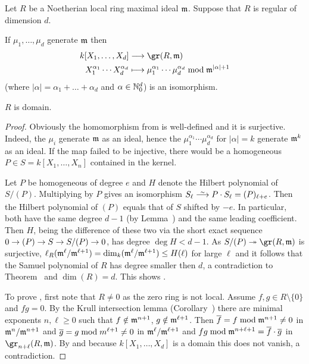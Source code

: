 \documentclass[a4paper,parskip=half,numbers=enddot, DIV=12]{scrreprt}
\begin{document}
\begin{cor}
    Let $R$ be a Noetherian local ring maximal ideal $\mathfrak{m}$. Suppose that $R$ is regular of dimension $d$.
    \begin{alphanumerate}
    \item 
        If $\mu_1,\ldots, \mu_d$ generate $\mathfrak{m}$ then 
        \begin{align*} 
            k[X_1,\ldots, X_d] &\morphism \gr(R,\mm)\\
            X_1^{\alpha_1}\cdots X_d^{\alpha_d} &\longmapsto \mu_1^{\alpha_1}\cdots\mu_d^{\alpha_d} \bmod \mm^{|\alpha| +1}
        \end{align*}
        (where $|\alpha|=\alpha_1+\ldots+\alpha_d$ and $\alpha\in\mathbb{N}_0^d$) is an isomorphism.
    \item 
        $R$ is domain.
    \end{alphanumerate}
\end{cor}
\begin{proof}
    Obviously the homomorphism from  is well-defined and it is surjective. Indeed, the $\mu_i$ generate $\mathfrak{m}$ as an ideal, hence the $\mu_1^{\alpha_1}\cdots\mu_d^{\alpha_d}$ for $|\alpha|=k$ generate $\mathfrak{m}^k$ as an ideal. If the map failed to be injective, there would be a homogeneous $P\in S=k[X_1,\ldots, X_n]$ contained in the kernel. 
    
    Let $P$ be homogeneous of degree $e$ and $H$ denote the Hilbert polynomial of $S/(P)$. Multiplying by $P$ gives an isomorphism $S_\ell\isomorphism P\cdot S_\ell=(P)_{\ell+e}$. Then the Hilbert polynomial of $(P)$ equals that of $S$ shifted by $-e$. In particular, both have the same degree $d-1$ (by Lemma~) and the same leading coefficient. Then $H$, being the difference of these two via the short exact sequence $0\morphism (P)\morphism S\morphism S/(P)\morphism 0$, has degree $\deg H < d-1$. As $S/(P)\epimorphism \gr (R,\mm)$ is surjective, $\ell_R(\mathfrak{m}^\ell /\mathfrak{m}^{\ell+1}) = \dim_k(\mathfrak{m}^\ell/\mathfrak{m}^{\ell+1}) \leq H(\ell)$ for large $\ell$ and it follows that the Samuel polynomial of $R$ has degree smaller then $d$, a contradiction to Theorem~ and $\dim(R) = d$. This shows .
    
    To prove , first note that $R\neq 0$ as the zero ring is not local. Assume $f,g\in R\setminus\{0\}$ and $fg = 0$. By the Krull intersection lemma (Corollary~) there are minimal exponents $n,\ell \geq 0$ such that $f\notin \mathfrak{m}^{n+1}$, $g\notin \mathfrak{m}^{\ell+1}$. Then $\overline f = f\bmod \mathfrak{m}^{n+1} \neq 0 $ in $\mathfrak{m}^n/\mathfrak{m}^{n+1}$ and $\overline g= g\bmod m^{\ell+1}\neq 0$ in $\mathfrak{m}^\ell/\mathfrak{m}^{\ell+1}$ and $fg\bmod \mathfrak{m}^{n+\ell+1} = \overline f\cdot \overline g$ in $\gr_{n+\ell}(R,\mm)$. By  and because $k[X_1,\ldots, X_d]$ is a domain this does not vanish, a contradiction.
\end{proof} 
\end{document}
